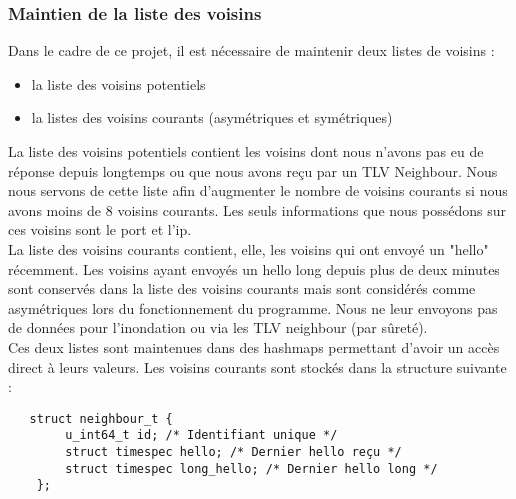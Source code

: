 \documentclass{FR16}
\begin{document}
\subsubsection{Maintien de la liste des voisins}
Dans le cadre de ce projet, il est nécessaire de maintenir deux listes de voisins : 
\begin{itemize}
    \item la liste des voisins potentiels 
    \item la listes des voisins courants (asymétriques et symétriques)
\end{itemize}
La liste des voisins potentiels contient les voisins dont nous n'avons pas eu de réponse depuis longtemps ou que nous avons reçu par un TLV Neighbour. Nous nous servons de cette liste afin d'augmenter le nombre de voisins courants si nous avons moins de 8 voisins courants. Les seuls informations que nous possédons sur ces voisins sont le port et l'ip.\\

La liste des voisins courants contient, elle, les voisins qui ont envoyé un "hello" récemment. Les voisins ayant envoyés un hello long depuis plus de deux minutes sont conservés dans la liste des voisins courants mais sont considérés comme asymétriques lors du fonctionnement du programme. Nous ne leur envoyons pas de données pour l'inondation ou via les TLV neighbour (par sûreté). \\

Ces deux listes sont maintenues dans des hashmaps permettant d'avoir un accès direct à leurs valeurs. Les voisins courants sont stockés dans la structure suivante : 
\begin{verbatim}
   struct neighbour_t {
        u_int64_t id; /* Identifiant unique */
        struct timespec hello; /* Dernier hello reçu */
        struct timespec long_hello; /* Dernier hello long */
    };
\end{verbatim} 
\end{document}
